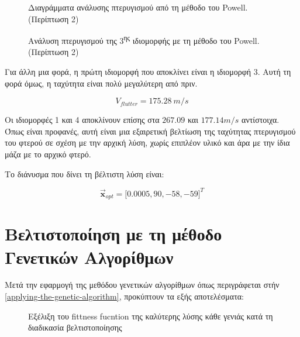 \begin{figure}[H]
    \centering
    
    \caption{Διαγράμματα ανάλυσης πτερυγισμού  από τη μέθοδο του \textlatin{Powell}. (Περίπτωση 2)}
    \label{fig:PowerllFlutterPlotScenario2}
\end{figure}


\begin{figure}[H]
    \centering
    
    \caption{Ανάλυση πτερυγισμού της 3\textsuperscript{ης} ιδιομορφής με τη μέθοδο του \textlatin{Powell}. (Περίπτωση 2)}
    \label{fig:PowerllFlutter3PlotScenario2}

\end{figure}

Για άλλη μια φορά, η πρώτη ιδιομορφή που αποκλίνει είναι η ιδιομορφή 3. Αυτή τη φορά όμως, η ταχύτητα είναι πολύ μεγαλύτερη από πριν.

\begin{equation}
V_{flutter} = 175.28\ m/s
\end{equation}

Οι ιδιομορφές 1 και 4 αποκλίνουν επίσης στα $267.09$ και $177.14 m/s$ αντίστοιχα. Όπως είναι προφανές, αυτή είναι μια εξαιρετική βελτίωση της ταχύτητας πτερυγισμού του φτερού σε σχέση με την αρχική λύση, χωρίς επιπλέον υλικό και άρα με την ίδια μάζα με το αρχικό φτερό.

Το διάνυσμα που δίνει τη βέλτιστη λύση είναι:

\begin{equation}
{\vec{\mathbf{x}}}_{opt} = \lbrack 0.0005,90, - 58, - 59\rbrack^{T}
\end{equation}


\section{Βελτιστοποίηση με τη μέθοδο Γενετικών Αλγορίθμων}
\label{genetic-algorithm-optimization}

Μετά την εφαρμογή της μεθόδου γενετικών αλγορίθμων όπως περιγράφεται στήν \autoref{applying-the-genetic-algorithm}, προκύπτουν τα εξής αποτελέσματα:

\begin{figure}[H]
    \centering
    
    \caption{Εξέλιξη του \textlatin{fittness fucntion} της καλύτερης λύσης κάθε γενιάς κατά τη διαδικασία βελτιστοποίησης}
    \label{fig:fitnessevolution}
\end{figure}


